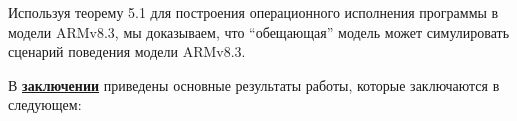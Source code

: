 Используя теорему 5.1 для построения операционного исполнения программы в модели ARMv8.3,
мы доказываем, что ``обещающая'' модель может симулировать сценарий поведения модели ARMv8.3.



В \underline{\textbf{заключении}} приведены основные результаты работы, которые заключаются в следующем:








